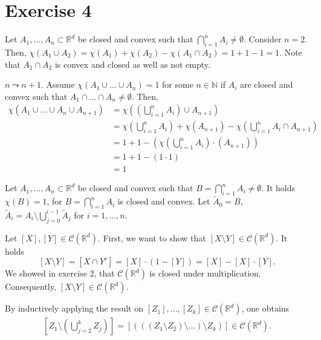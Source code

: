 \documentclass{article}
\begin{document}
\section*{Exercise 4}

Let $A_1,...,A_n \subset \mathbb R^d$ be closed and convex such that $\bigcap^n_{i=1} A_i \neq \emptyset$. Consider $n = 2$. Then, $\chi(A_1 \cup A_2) = \chi(A_1) + \chi(A_2) - \chi(A_1 \cap A_2) = 1 + 1 - 1 = 1$. Note that $A_1 \cap A_2$ is convex and closed as well as not empty.

$n \leadsto n+1$. Assume $\chi(A_1 \cup ... \cup A_n) = 1$ for some $n \in \mathbb N$ if $A_i$ are closed and convex such that $A_1 \cap ... \cap A_n \neq \emptyset$. Then, 
\begin{align*}
    \chi(A_1 \cup ... \cup A_n \cup A_{n+1}) &= \chi(\left(\bigcup^n_{i=1} A_i\right) \cup A_{n+1})\\
    &= \chi\left(\bigcup^n_{i=1} A_i\right) + \chi(A_{n+1}) - \chi(\bigcup^n_{i=1} A_i \cap A_{n+1}) \\
    &= 1 + 1 -\left(  \chi(\bigcup^n_{i=1} A_i)\cdot( A_{n+1})\right)  \\
    &= 1 + 1 -\left(  1\cdot1\right) \\
    &=1
\end{align*}

    
\iffalse
Let $A_1,...,A_n \subset \mathbb R^d$ be closed and convex such that $B = \bigcap^n_{i=1} A_i \neq \emptyset$. It holds $\chi(B) = 1$, for $B = \bigcap^n_{i=1} A_i$ is closed and convex. Let $\tilde A_0 = B$, $\tilde A_i = A_i \setminus \bigcup^{i-1}_{j=0}\tilde A_{j}$ for $i=1,...,n$. 

Let $[X],[Y] \in \mathcal C(\mathbb R^d)$. First, we want to show that $[X \setminus Y] \in \mathcal C(\mathbb R^d)$. It holds 
$$
    [X \setminus Y] = [X \cap Y^c] = [X] \cdot (1-[Y]) = [X] - [X] \cdot [Y].
$$ 
We showed in exercise 2, that $\mathcal C(\mathbb R^d)$ is closed under multiplication. Consequently, $[X \setminus Y] \in \mathcal C(\mathbb R^d)$. 

By inductively applying the result on $[Z_1],...,[Z_k] \in \mathcal C(\mathbb R^d)$, one obtains 
\begin{align}\label{krank}
    [Z_1 \setminus \left(\bigcup^{k}_{j=2} Z_j\right)] = [(((Z_1 \setminus Z_2) \setminus ...) \setminus Z_k)] \in \mathcal C(\mathbb R^d).
\end{align}
\end{document}
